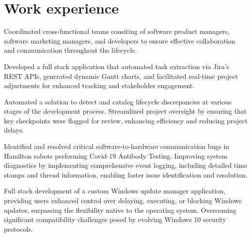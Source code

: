 \documentclass[]{farzad-resume}
\begin{document}
\begin{minipage}[t]{0.66\textwidth}



\section{Work experience}

\vspace{\topsep}
\begin{tightemize}
    {\fontsize{8}{10.4} \selectfont 
	\item Coordinated cross-functional teams consiting of software product managers, software marketing managers, and developers to ensure effective collaboration and communication throughout the lifecycle.
	\item Developed a full stack application that automated task extraction via Jira's REST APIs, generated dynamic Gantt charts, and facilitated real-time project adjustments for enhanced tracking and stakeholder engagement.
	\item  Automated a solution to detect and catalog lifecycle discrepancies at various stages of the development process. Streamlined project oversight by ensuring that key checkpoints were flagged for review, enhancing efficiency and reducing project delays. }
\end{tightemize}
\sectionsep

\vspace{\topsep}
\begin{tightemize}
{\fontsize{8}{10.4} \selectfont 
\item Identified and resolved critical software-to-hardware communication bugs in Hamilton robots performing Covid-19 Antibody Testing. Improving system diagnostics by implementing comprehensive event logging, including detailed time stamps and thread information, enabling faster issue identification and resolution.

\item Full stack development of a custom Windows update manager application, providing users enhanced
control over delaying, executing, or blocking Windows updates, surpassing the flexibility native to
the operating system. Overcoming significant compatibility challenges posed by evolving Windows 10 security protocols.

}
\end{tightemize}
\end{minipage}
\end{document}
